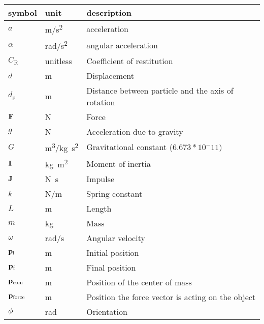 \documentclass[12pt]{article}
\begin{document}
\renewcommand{\arraystretch}{1.2}
\noindent \begin{longtable}{l l p{12cm}} \toprule
  \textbf{symbol} & \textbf{unit} & \textbf{description}\\
  \midrule 

  $a$ & \si[per-mode=symbol] {\metre\per\second^{2}} & acceleration
  \\
  $\alpha$ & \si[per-mode=symbol] {\radian\per\second^{2}} & angular acceleration
  \\
  $C_\text{R}$ &unitless & Coefficient of restitution 
  \\ 
  $d$ & \si[per-mode=symbol] {\metre}   & Displacement
  \\ 
  $d_\text{p}$ & \si[per-mode=symbol] {\metre}   & Distance between particle and the axis of rotation
  \\ 
  $\bf{F}$ & \si[per-mode=symbol] {\newton}   & Force
  \\ 
  $g$ & \si[per-mode=symbol] {\newton}   & Acceleration due to gravity
  \\ 
  $G$ & \si[per-mode=symbol] {\metre^{3}\per\kilo\gram \second^{2}}   & Gravitational constant  ($6.673*10^-{11})$
  \\
  $\bf{I}$ & \si[per-mode=symbol] {\kilo\gram\metre^{2}}   & Moment of inertia
  \\ 
  $\bf{J}$ & \si[per-mode=symbol] {\newton\second}   & Impulse
  \\ 
  $k$ & \si[per-mode=symbol] {\newton\per\metre}   & Spring constant
  \\ 
  $L$ & \si[per-mode=symbol] {\metre}   & Length
  \\ 
  $m$ & \si[per-mode=symbol] {\kilo\gram}   & Mass
  \\ 
  $\bf{\omega}$ & \si[per-mode=symbol] {\radian\per\second}   & Angular velocity
  \\ 
  $\bf{p_\text{i}}$ & \si[per-mode=symbol] {\metre}  & Initial position
  \\ 
  $\bf{p_\text{f}}$ & \si[per-mode=symbol] {\metre}   & Final position
  \\ 
  $\bf{p_\text{com}}$ & \si[per-mode=symbol] {\metre}   & Position of the center of mass
  \\ 
  $\bf{p_\text{force}}$ & \si[per-mode=symbol] {\metre}   & Position the force vector is acting on the object
  \\ 
  $\phi$ & \si[per-mode=symbol] {\radian}   & Orientation
  \\ 

\end{longtable}
\end{document}
